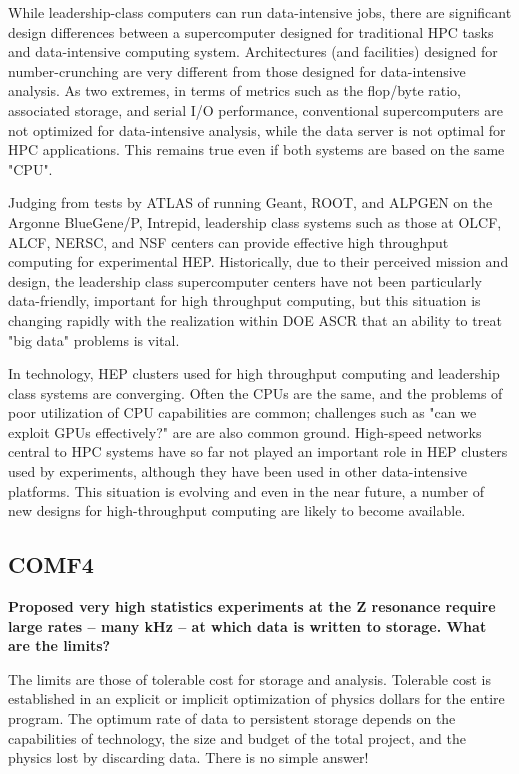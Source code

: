 While leadership-class computers can run data-intensive jobs, there are significant design differences between a supercomputer designed for traditional HPC tasks and data-intensive computing system.  Architectures (and facilities) designed for number-crunching are very different from those designed for data-intensive analysis. As two extremes, in terms of metrics such as the flop/byte ratio, associated storage, and serial I/O performance, conventional supercomputers are not optimized for data-intensive analysis, while the data server is not optimal for HPC applications. This remains true even if both systems are based on the same "CPU".

Judging from tests by ATLAS of running Geant, ROOT, and ALPGEN on the Argonne BlueGene/P, Intrepid, leadership class systems such as those at OLCF, ALCF, NERSC, and NSF centers can provide effective high throughput computing for experimental HEP. Historically, due to their perceived mission and design, the leadership class supercomputer centers have not been particularly data-friendly, important for high throughput computing, but this situation is changing rapidly with the realization within DOE ASCR that an ability to treat "big data" problems is vital.

In technology, HEP clusters used for high throughput computing and leadership class systems are converging.  Often the CPUs are the same, and the problems of poor utilization of CPU capabilities are common; challenges such as "can we exploit GPUs effectively?" are are also common ground. High-speed networks central to HPC systems have so far not played an important role in HEP clusters used by experiments, although they have been used in other data-intensive platforms. This situation is evolving and even in the near future, a number of new designs for high-throughput computing are likely to become available. 

\subsection{COMF4}

{\bf
 Proposed very high statistics experiments at the Z resonance require large rates --
many kHz -- at which data is written to storage. What are the limits?}


The limits are those of tolerable cost for storage and analysis.
Tolerable cost is established in an explicit or implicit optimization of
physics dollars for the entire program.  The optimum rate of data to persistent
storage depends on the capabilities of technology, the size and budget of
the total project, and the physics lost by discarding data. There is no
simple answer!



